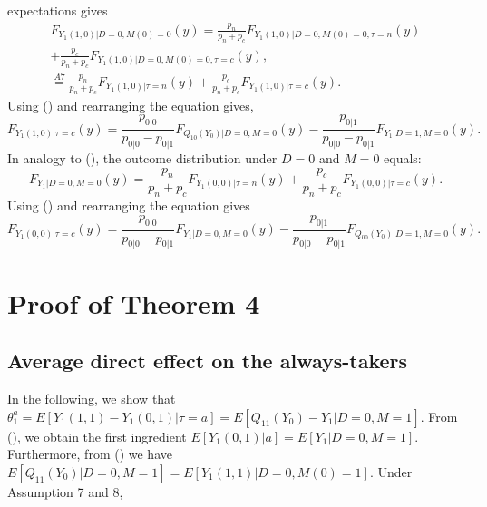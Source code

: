 \documentclass[a4paper,12pt]{article}
\begin{document}
 \doublespacing \pagestyle{plain}expectations gives
\begin{align*}
F_{Y_{1}(1,0)|D=0,M(0)=0}(y)   = \frac{p_n}{p_n + p_c} F_{Y_{1}(1,0)|D=0,M(0)=0,\tau=n}(y)\\  +\frac{p_c}{p_n + p_c} F_{Y_{1}(1,0)|D=0,M(0)=0,\tau=c}(y),\\
 \stackrel{A7}{=} \frac{p_n}{p_n + p_c} F_{Y_{1}(1,0)|\tau=n}(y) +\frac{p_c}{p_n + p_c} F_{Y_{1}(1,0)|\tau=c}(y).
\end{align*}
Using () and rearranging the equation gives,
\begin{equation} 
F_{Y_{1}(1,0)|\tau=c}(y) = \frac{p_{0|0}}{p_{0|0} - p_{0|1}}  F_{Q_{10}(Y_{0})|D=0,M=0}(y) - \frac{p_{0|1}}{ p_{0|0} - p_{0|1}}  F_{Y_1|D=1,M=0}(y).
\end{equation}
In analogy to (), the outcome distribution under $D=0$ and $M=0$ equals:
\begin{equation*}
F_{Y_{1}|D=0,M=0}(y) =\frac{p_n}{p_n + p_c}F_{Y_{1}(0,0)|\tau=n}(y)  + \frac{p_c}{p_n + p_c}F_{Y_{1}(0,0)|\tau=c}(y).
\end{equation*}
Using () and rearranging the equation gives
\begin{equation} 
F_{Y_{1}(0,0)|\tau=c}(y)= \frac{p_{0|0}}{p_{0|0} - p_{0|1}} F_{Y_{1}|D=0,M=0}(y) - \frac{p_{0|1} }{p_{0|0} - p_{0|1}}F_{Q_{00}(Y_{0})|D=1,M=0}(y) .
\end{equation}
\section{Proof of Theorem 4 }
 \subsection{Average direct effect on the
always-takers}
In the following, we show that $\theta_1^a= E[Y_1(1,1)-Y_1(0,1)|\tau=a]= E[Q_{11}(Y_0)-Y_1|D=0,M=1]$. From (), we obtain the first ingredient $E[Y_1(0,1)|a]=E[Y_1|D=0,M=1]$. Furthermore, from () we have $E[Q_{11}(Y_0)|D=0,M=1] = E[Y_1(1,1)|D=0,M(0)=1]$. Under Assumption 7 and 8,
\end{document}
